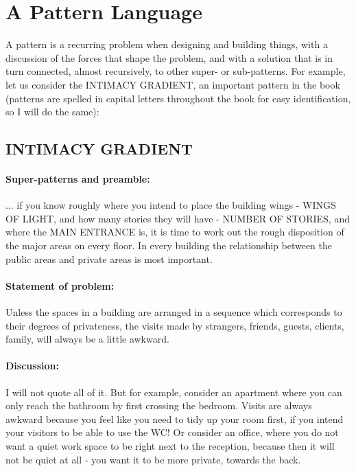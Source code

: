 \section*{A Pattern Language}

A pattern is a recurring problem when designing and building things, with a discussion of the forces that shape the problem, and with a solution that is in turn connected, almost recursively, to other super- or sub-patterns.  For example, let us consider the INTIMACY GRADIENT, an important pattern in the book (patterns are spelled in capital letters throughout the book for easy identification, so I will do the same):

\subsection*{INTIMACY GRADIENT}

\paragraph*{Super-patterns and preamble:}
... if you know roughly where you intend to place the building wings - WINGS OF LIGHT, and how many stories they will have - NUMBER OF STORIES, and where the MAIN ENTRANCE is, it is time to work out the rough disposition of the major areas on every floor.  In every building the relationship between the public areas and private areas is most important.

\paragraph*{Statement of problem:}
Unless the spaces in a building are arranged in a sequence which corresponds to their degrees of privateness, the visits made by strangers, friends, guests, clients, family, will always be a little awkward.

\paragraph*{Discussion:}
I will not quote all of it. But for example, consider an apartment where you can only reach the bathroom by first crossing the bedroom. Visits are always awkward because you feel like you need to tidy up your room first, if you intend your visitors to be able to use the WC! Or consider an office, where you do not want a quiet work space to be right next to the reception, because then it will not be quiet at all - you want it to be more private, towards the back.

